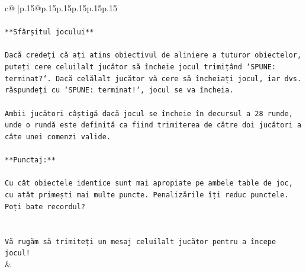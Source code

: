 \documentclass{article}
\begin{document}
{\begin{supertabular}{c@{$\;$}|p{.15\linewidth}@{}p{.15\linewidth}p{.15\linewidth}p{.15\linewidth}p{.15\linewidth}p{.15\linewidth}}
{{{\\ 
\\ 
\texttt{**Sfârșitul jocului**} \\
\\ 
\texttt{Dacă credeți că ați atins obiectivul de aliniere a tuturor obiectelor, puteți cere celuilalt jucător să încheie jocul trimițând `SPUNE: terminat?`. Dacă celălalt jucător vă cere să încheiați jocul, iar dvs. răspundeți cu `SPUNE: terminat!`, jocul se va încheia.} \\
\\ 
\texttt{Ambii jucători câștigă dacă jocul se încheie în decursul a 28 runde, unde o rundă este definită ca fiind trimiterea de către doi jucători a câte unei comenzi valide.} \\
\\ 
\texttt{**Punctaj:**} \\
\\ 
\texttt{Cu cât obiectele identice sunt mai apropiate pe ambele table de joc, cu atât primești mai multe puncte. Penalizările îți reduc punctele. Poți bate recordul?} \\
\\ 
\\ 
\texttt{Vă rugăm să trimiteți un mesaj celuilalt jucător pentru a începe jocul!} \\
            }
        }
    }
    & \\ \\


\end{supertabular}}
\end{document}
